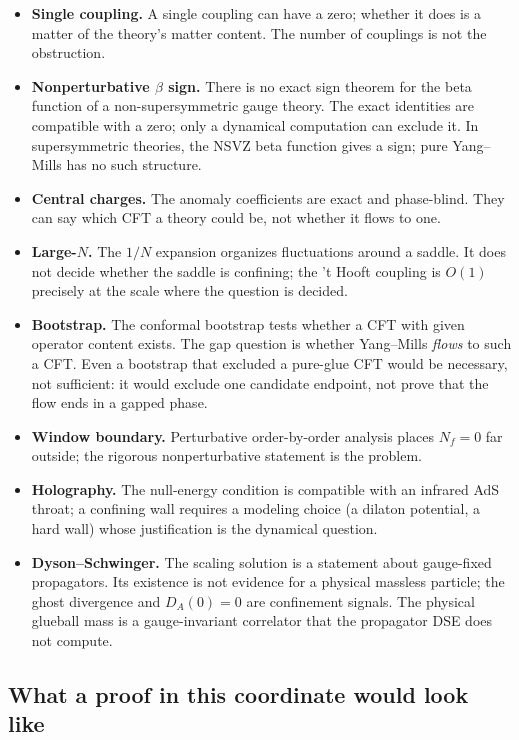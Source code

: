 \begin{itemize}
\item \textbf{Single coupling.} A single coupling can have a zero; whether it does is a matter of
  the theory's matter content. The number of couplings is not the obstruction.
\item \textbf{Nonperturbative $\beta$ sign.} There is no exact sign theorem for the beta function
  of a non-supersymmetric gauge theory. The exact identities are compatible with a zero; only a
  dynamical computation can exclude it. In supersymmetric theories, the NSVZ beta function gives
  a sign; pure Yang--Mills has no such structure.
\item \textbf{Central charges.} The anomaly coefficients are exact and phase-blind. They can say
  which CFT a theory could be, not whether it flows to one.
\item \textbf{Large-$N$.} The $1/N$ expansion organizes fluctuations around a saddle. It does not
  decide whether the saddle is confining; the 't Hooft coupling is $O(1)$ precisely at the scale
  where the question is decided.
\item \textbf{Bootstrap.} The conformal bootstrap tests whether a CFT with given operator content
  exists. The gap question is whether Yang--Mills \emph{flows} to such a CFT. Even a bootstrap
  that excluded a pure-glue CFT would be necessary, not sufficient: it would exclude one
  candidate endpoint, not prove that the flow ends in a gapped phase.
\item \textbf{Window boundary.} Perturbative order-by-order analysis places $N_f=0$ far outside;
  the rigorous nonperturbative statement is the problem.
\item \textbf{Holography.} The null-energy condition is compatible with an infrared AdS throat;
  a confining wall requires a modeling choice (a dilaton potential, a hard wall) whose
  justification is the dynamical question.
\item \textbf{Dyson--Schwinger.} The scaling solution is a statement about gauge-fixed
  propagators. Its existence is not evidence for a physical massless particle; the ghost
  divergence and $D_A(0)=0$ are confinement signals. The physical glueball mass is a
  gauge-invariant correlator that the propagator DSE does not compute.
\end{itemize}

\subsection{What a proof in this coordinate would look like}

